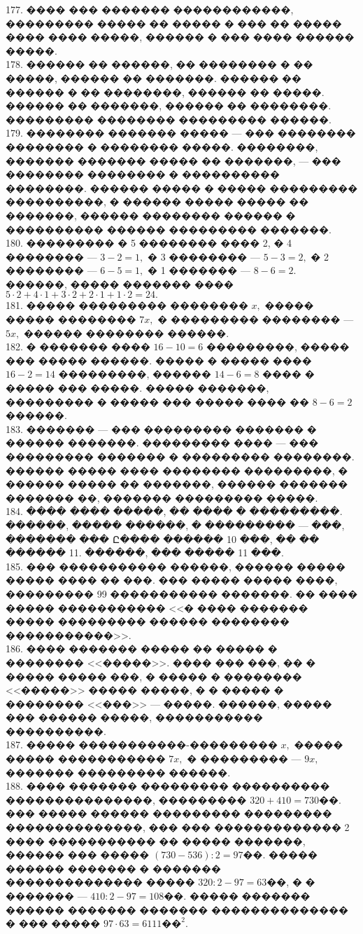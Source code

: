 \documentclass[12pt]{article}
\begin{document}
177. ���� ��� ������� ������������, ��������� ����� �� ����� � ��� �� ����� ���� ���� �����, ������ � ��� ���� ������ �����.\\
178. ������ �� ������, �� �������� � �� �����, ������ �� �������. ������ �� ������ � �� ��������, ������ �� �����. ������ �� �������, ������ �� ��������. ��������� �������� ��������� ������.\\
179. �������� ������� ����� --- ��� �������� �������� � �������� �����. ��������, ������� ������� ����� �� �������, --- ��� �������� �������� � ���������� ��������. ������ ����� � ����� ��������� ����������, � ������ ����� ����� �� �������, ������ �������� ������ � ���������� ������ ��������� �������.\\
180. ��������� � 5 �������� ���� 2, � 4 �������� --- $3-2=1,$ � 3 �������� --- $5-3=2,$ � 2 �������� --- $6-5=1,$ � 1 ������� --- $8-6=2.$ ������, ����� ������� ���� $5\cdot2+4\cdot1+3\cdot2+2\cdot1+1\cdot2=24.$\\
181. ����� ��������� �������� $x,$ ����� ����� �������� $7x,$ � ��������� �������� --- $5x,$ ������ �������� ������.\\
182. � ������� ���� $16-10=6$ ���������, ����� ��� ����� ������. ����� � ����� ���� $16-2=14$ ���������, ������ $14-6=8$ ���� � ����� ��� �����. ����� �������, ��������� � ����� ��� ����� ���� �� $8-6=2$ ������.\\
183. ������� --- ��� ��������� ������� � ������ �������. ��������� ���� --- ��� ��������� ������� � ��������� ��������. ������ ����� ���� �������� ���������, � ������ ����� �� �������, ������ ������� ������� ��, ������� ��������� �����.\\
184. ���� ���� �����, �� ���� � ���������. ������, ����� ������, � ��������� --- ���, ������� ��� Ը���� ������ 10 ���, �� �� ������ 11. ������, ��� ����� 11 ���.\\
185. ��� ����������� ������, ������ ����� ����� ���� �� ���. ��� ����� ����� ����, ��������� 99 ����������� �������. �� ���� ����� ����������� <<� ���� ������� ����� ��������� ������ �������� �����������>>.\\
186. ���� ������� ����� �� ����� � �������� <<�����>>. ���� ��� ���, �� � ����� ����� ���, � ����� � �������� <<�����>> ����� �����, � � ����� � �������� <<���>> --- �����. ������, ����� ��� ������ �����, ����������� ����������.\\
187. ����� �����������-��������� $x,$ ����� ����� ����������� $7x,$ � ��������� --- $9x,$ ������� ��������� ������.\\
188. ���� ������� ��������� ���������� ���������������, ��������� $320+410=730$��. ��� ����� ������ ��������� ��������� ��������������, ��� ��� ������������� 2 ���� ����������� �� ����� �������, ������ ��� ����� $(730-536):2=97$��. ����� ������ ������� � ������� �������������� ����� $320:2-97=63$��, � � ������� --- $410:2-97=108$��. ����� ������� ������ ������� ������� �������������� � ��� ����� $97\cdot63=6111\text{��}^2.$\\
\end{document}
